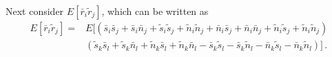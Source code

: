 Next consider $E[\bar{r}_i\tilde{r}_j]$, which can be written as
\begin{equation}
  \begin{split}
E[\bar{r}_i\tilde{r}_j] = &E[(\bar{s}_i\bar{s}_j + \bar{s}_i\bar{n}_j +\tilde{s}_i\tilde{s}_j+\tilde{n}_i\tilde{n}_j + \bar{n}_i\bar{s}_j+\bar{n}_i\bar{n}_j+\tilde{n}_i\tilde{s}_j+\tilde{n}_i\tilde{n}_j)\\
              &(\tilde{s}_k\bar{s}_l + \tilde{s}_k\bar{n}_l + \tilde{n}_k\bar{s}_l + \tilde{n}_k\bar{n}_l - \bar{s}_k\tilde{s}_l - \bar{s}_k\tilde{n}_l - \bar{n}_k\tilde{s}_l - \bar{n}_k\tilde{n}_l)]\,.

\end{split}
\end{equation}
